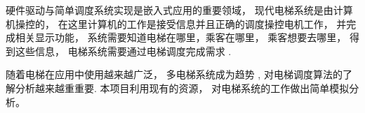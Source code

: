 \documentclass[../main.tex]{subfiles} %
\begin{document}
硬件驱动与简单调度系统实现是嵌入式应用的重要领域，
现代电梯系统是由计算机操控的，
在这里计算机的工作是接受信息并且正确的调度操控电机工作，
并完成相关显示功能，
系统需要知道电梯在哪里，乘客在哪里，
乘客想要去哪里，
得到这些信息，
电梯系统需要通过电梯调度完成需求
.


随着电梯在应用中使用越来越广泛，
多电梯系统成为趋势
,
对电梯调度算法的了解分析越来越重重要.
本项目利用现有的资源，
对电梯系统的工作做出简单模拟分析。
\end{document}
